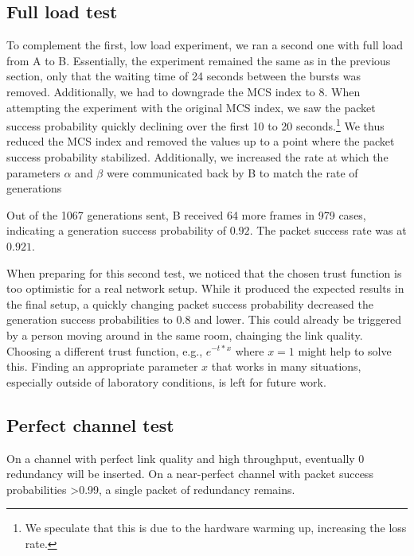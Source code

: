 \documentclass[10pt,a4paper]{article}
\begin{document}
\subsection{Full load test}
To complement the first, low load experiment, we ran a second one with full load from A to B.
Essentially, the experiment remained the same as in the previous section, only that the waiting time of 24 seconds between the bursts was removed.
Additionally, we had to downgrade the MCS index to 8.
When attempting the experiment with the original MCS index, we saw the packet success probability quickly declining over the first 10 to 20 seconds.\footnote{%
	We speculate that this is due to the hardware warming up, increasing the loss rate.}
We thus reduced the MCS index and removed the values up to a point where the packet success probability stabilized.
Additionally, we increased the rate at which the parameters $\alpha$ and $\beta$ were communicated back by B to match the rate of generations

Out of the 1067 generations sent, B received 64 more frames in 979 cases, indicating a generation success probability of $0.92$.
The packet success rate was at $0.921$.

When preparing for this second test, we noticed that the chosen trust function is too optimistic for a real network setup.
While it produced the expected results in the final setup, a quickly changing packet success probability decreased the generation success probabilities to $0.8$ and lower.
This could already be triggered by a person moving around in the same room, chainging the link quality.
Choosing a different trust function, e.g., $e^{-t*x}$ where $x=1$ might help to solve this.
Finding an appropriate parameter $x$ that works in many situations, especially outside of laboratory conditions, is left for future work.

\subsection{Perfect channel test}
On a channel with perfect link quality and high throughput, eventually 0 redundancy will be inserted.
On a near-perfect channel with packet success probabilities >0.99, a single packet of redundancy remains.
\end{document}
